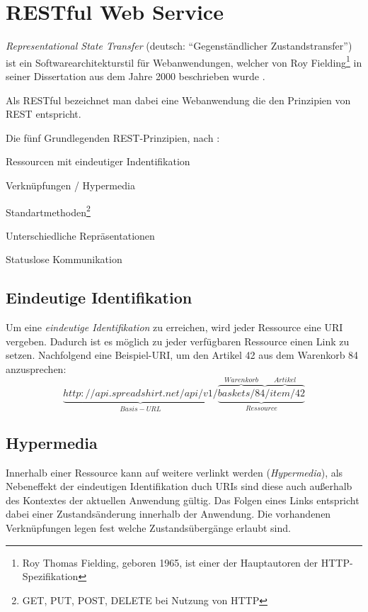 \section{RESTful Web Service}

\emph{Representational State Transfer} (deutsch: \enquote{Gegenständlicher Zustandstransfer}) ist ein Softwarearchitekturstil für Webanwendungen, welcher von Roy Fielding\footnote{Roy Thomas Fielding, geboren 1965, ist einer der Hauptautoren der HTTP-Spezifikation} in seiner Dissertation aus dem Jahre 2000  beschrieben wurde \cite[Kapitel 5][95 ff.]{fieldingDissertation}. 

Als \gls{RESTful} bezeichnet man dabei eine Webanwendung die den Prinzipien von \gls{REST} entspricht. 

Die fünf Grundlegenden REST-Prinzipien, nach \cite[11 ff.]{Tilkov09}:
\begin{compactitem}
	\item Ressourcen mit eindeutiger Indentifikation
	\item Verknüpfungen / Hypermedia
	\item Standartmethoden\footnote{GET, PUT, POST, DELETE bei Nutzung von HTTP}
	\item Unterschiedliche Repräsentationen
	\item Statuslose Kommunikation
\end{compactitem}

\subsection{Eindeutige Identifikation}
\label{sec:unambigiousidentification}

Um eine \emph{eindeutige Identifikation} zu erreichen, wird jeder Ressource eine \gls{URI} vergeben. Dadurch ist es möglich zu jeder verfügbaren Ressource einen Link zu setzen. 
Nachfolgend eine Beispiel-\gls{URI}, um den Artikel 42 aus dem Warenkorb 84 anzusprechen:
\[
	\underbrace{http://api.spreadshirt.net/api/v1/}_{Basis-URL}\underbrace{\overbrace{baskets/84}^{Warenkorb}\overbrace{/item/42}^{Artikel}}_{Ressource}
	\label{RESTexampleURL}
\]

\subsection{Hypermedia}

Innerhalb einer Ressource kann auf weitere verlinkt werden (\emph{Hypermedia}), als Nebeneffekt der eindeutigen Identifikation duch \glspl{URI} sind diese auch außerhalb des Kontextes der aktuellen Anwendung gültig. Das Folgen eines Links entspricht dabei einer Zustandsänderung innerhalb der Anwendung.
Die vorhandenen Verknüpfungen legen fest welche Zustandsübergänge  erlaubt sind.

